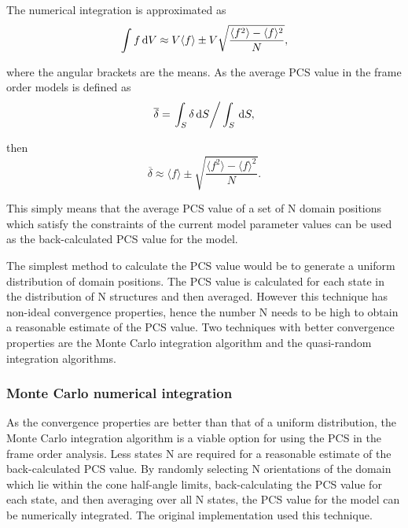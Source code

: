 The numerical integration is approximated as
\begin{equation}
    \int f \,\mathrm{d} V \approx V \langle f \rangle \pm V \sqrt{\frac{\langle f^2 \rangle - \langle f \rangle^2}{N}} ,
\end{equation}

where the angular brackets are the means.
As the average PCS value in the frame order models is defined as
\begin{equation}
    \overline\delta = \left. \int_S \delta \,\mathrm{d} S \right / \int_S \,\mathrm{d} S ,
\end{equation}

then
\begin{equation}
    \overline\delta \approx \langle f \rangle \pm \sqrt{\frac{\langle f^2 \rangle - \langle f \rangle^2}{N}} .
\end{equation}

This simply means that the average PCS value of a set of N domain positions which satisfy the constraints of the current model parameter values can be used as the back-calculated PCS value for the model.

The simplest method to calculate the PCS value would be to generate a uniform distribution of domain positions.
The PCS value is calculated for each state in the distribution of N structures and then averaged.
However this technique has non-ideal convergence properties, hence the number N needs to be high to obtain a reasonable estimate of the PCS value.
Two techniques with better convergence properties are the Monte Carlo integration algorithm and the quasi-random integration algorithms.




\subsubsection{Monte Carlo numerical integration}

As the convergence properties are better than that of a uniform distribution, the Monte Carlo integration algorithm is a viable option for using the PCS in the frame order analysis.
Less states N are required for a reasonable estimate of the back-calculated PCS value.
By randomly selecting N orientations of the domain which lie within the cone half-angle limits, back-calculating the PCS value for each state, and then averaging over all N states, the PCS value for the model can be numerically integrated.
The original implementation used this technique.



